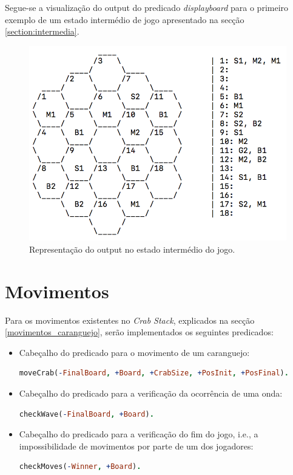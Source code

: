 \documentclass[a4paper]{article}
\begin{document}
Segue-se a visualização do output do predicado \textit{display\textunderscore board} para o primeiro exemplo de um estado intermédio de jogo apresentado na secção \ref{section:intermedia}.

\begin{figure}[!ht]
	\begin{center}
	\includegraphics[scale=0.4]{display_board.png}
	\caption{Representação do output no estado intermédio do jogo.}
    \label{Fig:display_board}
	\end{center}
\end{figure}

\newpage
\section{Movimentos}

Para os movimentos existentes no \textit{Crab Stack}, explicados na secção \ref{movimentos_caranguejo}, serão implementados os seguintes predicados:

\begin{itemize}
\item Cabeçalho do predicado para o movimento de um caranguejo:
\begin{lstlisting}[language=Prolog]
moveCrab(-FinalBoard, +Board, +CrabSize, +PosInit, +PosFinal).
\end{lstlisting}
\item Cabeçalho do predicado para a verificação da ocorrência de uma onda:
\begin{lstlisting}[language=Prolog]
checkWave(-FinalBoard, +Board).
\end{lstlisting}
\item Cabeçalho do predicado para a verificação do fim do jogo, i.e., a impossibilidade de movimentos por parte de um dos jogadores:
\begin{lstlisting}[language=Prolog]
checkMoves(-Winner, +Board).
\end{lstlisting}
\end{itemize}
\end{document}
